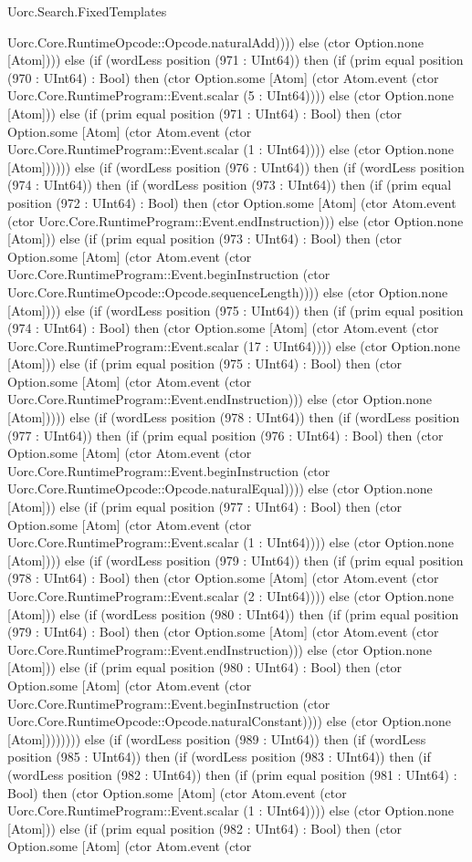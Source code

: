 \begin{lexlean}{Uorc.Search.FixedTemplates}
\begin{semanticmodule}
{Uorc.Core.RuntimeOpcode::Opcode.naturalAdd)))) else (ctor Option.none [Atom]))) else (if (wordLess position (971 : UInt64)) then (if (prim equal position (970 : UInt64) : Bool) then (ctor Option.some [Atom] (ctor Atom.event (ctor Uorc.Core.RuntimeProgram::Event.scalar (5 : UInt64)))) else (ctor Option.none [Atom])) else (if (prim equal position (971 : UInt64) : Bool) then (ctor Option.some [Atom] (ctor Atom.event (ctor Uorc.Core.RuntimeProgram::Event.scalar (1 : UInt64)))) else (ctor Option.none [Atom]))))) else (if (wordLess position (976 : UInt64)) then (if (wordLess position (974 : UInt64)) then (if (wordLess position (973 : UInt64)) then (if (prim equal position (972 : UInt64) : Bool) then (ctor Option.some [Atom] (ctor Atom.event (ctor Uorc.Core.RuntimeProgram::Event.endInstruction))) else (ctor Option.none [Atom])) else (if (prim equal position (973 : UInt64) : Bool) then (ctor Option.some [Atom] (ctor Atom.event (ctor Uorc.Core.RuntimeProgram::Event.beginInstruction (ctor Uorc.Core.RuntimeOpcode::Opcode.sequenceLength)))) else (ctor Option.none [Atom]))) else (if (wordLess position (975 : UInt64)) then (if (prim equal position (974 : UInt64) : Bool) then (ctor Option.some [Atom] (ctor Atom.event (ctor Uorc.Core.RuntimeProgram::Event.scalar (17 : UInt64)))) else (ctor Option.none [Atom])) else (if (prim equal position (975 : UInt64) : Bool) then (ctor Option.some [Atom] (ctor Atom.event (ctor Uorc.Core.RuntimeProgram::Event.endInstruction))) else (ctor Option.none [Atom])))) else (if (wordLess position (978 : UInt64)) then (if (wordLess position (977 : UInt64)) then (if (prim equal position (976 : UInt64) : Bool) then (ctor Option.some [Atom] (ctor Atom.event (ctor Uorc.Core.RuntimeProgram::Event.beginInstruction (ctor Uorc.Core.RuntimeOpcode::Opcode.naturalEqual)))) else (ctor Option.none [Atom])) else (if (prim equal position (977 : UInt64) : Bool) then (ctor Option.some [Atom] (ctor Atom.event (ctor Uorc.Core.RuntimeProgram::Event.scalar (1 : UInt64)))) else (ctor Option.none [Atom]))) else (if (wordLess position (979 : UInt64)) then (if (prim equal position (978 : UInt64) : Bool) then (ctor Option.some [Atom] (ctor Atom.event (ctor Uorc.Core.RuntimeProgram::Event.scalar (2 : UInt64)))) else (ctor Option.none [Atom])) else (if (wordLess position (980 : UInt64)) then (if (prim equal position (979 : UInt64) : Bool) then (ctor Option.some [Atom] (ctor Atom.event (ctor Uorc.Core.RuntimeProgram::Event.endInstruction))) else (ctor Option.none [Atom])) else (if (prim equal position (980 : UInt64) : Bool) then (ctor Option.some [Atom] (ctor Atom.event (ctor Uorc.Core.RuntimeProgram::Event.beginInstruction (ctor Uorc.Core.RuntimeOpcode::Opcode.naturalConstant)))) else (ctor Option.none [Atom]))))))) else (if (wordLess position (989 : UInt64)) then (if (wordLess position (985 : UInt64)) then (if (wordLess position (983 : UInt64)) then (if (wordLess position (982 : UInt64)) then (if (prim equal position (981 : UInt64) : Bool) then (ctor Option.some [Atom] (ctor Atom.event (ctor Uorc.Core.RuntimeProgram::Event.scalar (1 : UInt64)))) else (ctor Option.none [Atom])) else (if (prim equal position (982 : UInt64) : Bool) then (ctor Option.some [Atom] (ctor Atom.event (ctor }
\end{semanticmodule}
\end{lexlean}
